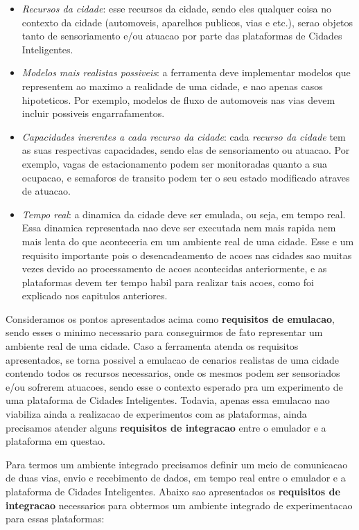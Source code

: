 \begin{itemize}
    \item \textit{Recursos da cidade}: esse recursos da cidade, sendo eles qualquer coisa no contexto da cidade (automoveis, aparelhos publicos, vias e etc.), serao objetos tanto de
        sensoriamento e/ou atuacao por parte das plataformas de Cidades Inteligentes.

    \item \textit{Modelos mais realistas possiveis}: a ferramenta deve implementar modelos que representem ao maximo a realidade de uma cidade, e nao apenas casos hipoteticos.
        Por exemplo, modelos de fluxo de automoveis nas vias devem incluir possiveis engarrafamentos.

    \item \textit{Capacidades inerentes a cada recurso da cidade}: cada \textit{recurso da cidade} tem as suas respectivas capacidades, sendo elas de sensoriamento ou atuacao.
        Por exemplo, vagas de estacionamento podem ser monitoradas quanto a sua ocupacao, e semaforos de transito podem ter o seu estado modificado atraves de atuacao.

    \item \textit{Tempo real}: a dinamica da cidade deve ser emulada, ou seja, em tempo real. Essa dinamica representada nao deve ser executada nem mais rapida nem mais lenta do que
        aconteceria em um ambiente real de uma cidade.
        Esse e um requisito importante pois o desencadeamento de acoes nas cidades sao muitas vezes devido ao processamento de acoes acontecidas anteriormente, e as plataformas
        devem ter tempo habil para realizar tais acoes, como foi explicado nos capitulos anteriores.
\end{itemize}

Consideramos os pontos apresentados acima como \textbf{requisitos de emulacao}, sendo esses o minimo necessario para conseguirmos de fato representar um ambiente real de uma cidade.
Caso a ferramenta atenda os requisitos apresentados, se torna possivel a emulacao de cenarios realistas de uma cidade contendo todos os recursos necessarios, onde os mesmos podem ser
sensoriados e/ou sofrerem atuacoes, sendo esse o contexto esperado pra um experimento de uma plataforma de Cidades Inteligentes.
Todavia, apenas essa emulacao nao viabiliza ainda a realizacao de experimentos com as plataformas, ainda precisamos atender alguns \textbf{requisitos de integracao} entre o emulador
e a plataforma em questao.

Para termos um ambiente integrado precisamos definir um meio de comunicacao de duas vias, envio e recebimento de dados, em tempo real entre o emulador e a plataforma de Cidades Inteligentes.
Abaixo sao apresentados os \textbf{requisitos de integracao} necessarios para obtermos um ambiente integrado de experimentacao para essas plataformas:

